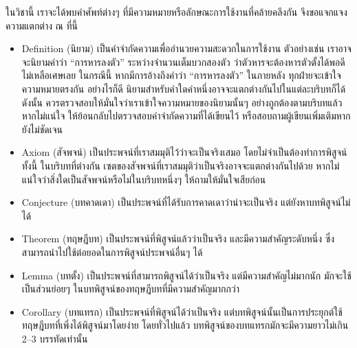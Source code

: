 ในวิชานี้ เราจะได้พบคำศัพท์ต่างๆ ที่มีความหมายหรือลักษณะการใช้งานที่คล้ายคลึงกัน จึงขอแจกแจงความแตกต่าง ณ ที่นี้
\begin{itemize}
    \item Definition (นิยาม) เป็นคำจำกัดความเพื่ออำนวยความสะดวกในการใช้งาน \enskip ตัวอย่างเช่น เราอาจจะนิยามคำว่า ``การหารลงตัว'' ระหว่างจำนวนเต็มบวกสองตัว ว่าตัวหารจะต้องหารตัวตั้งได้พอดี ไม่เหลือเศษเลย \enskip ในกรณีนี้ หากมีการอ้างถึงคำว่า ``การหารลงตัว'' ในภายหลัง ทุกฝ่ายจะเข้าใจความหมายตรงกัน \enskip อย่างไรก็ดี นิยามสำหรับคำใดคำหนึ่งอาจจะแตกต่างกันไปในแต่ละบริบทก็ได้ ดังนั้น ควรตรวจสอบให้มั่นใจว่าเราเข้าใจความหมายของนิยามนั้นๆ อย่างถูกต้องตามบริบทแล้ว \enskip หากไม่แน่ใจ ให้ย้อนกลับไปตรวจสอบคำจำกัดความที่ได้เขียนไว้ หรือสอบถามผู้เขียนเพิ่มเติมหากยังไม่ชัดเจน
    \item Axiom (สัจพจน์) เป็นประพจน์ที่เราสมมุติไว้ว่าจะเป็นจริงเสมอ โดยไม่จำเป็นต้องทำการพิสูจน์ \enskip ทั้งนี้ ในบริบทที่ต่างกัน เซตของสัจพจน์ที่เราสมมุติว่าเป็นจริงอาจจะแตกต่างกันไปด้วย \enskip หากไม่แน่ใจว่าสิ่งใดเป็นสัจพจน์หรือไม่ในบริบทหนึ่งๆ ให้ถามให้มั่นใจเสียก่อน
    \item Conjecture (บทคาดเดา) เป็นประพจน์ที่ได้รับการคาดเดาว่าน่าจะเป็นจริง แต่ยังหาบทพิสูจน์ไม่ได้
    \item Theorem (ทฤษฎีบท) เป็นประพจน์ที่พิสูจน์แล้วว่าเป็นจริง และมีความสำคัญระดับหนึ่ง ซึ่งสามารถนำไปใช้ต่อ\-ยอดในการพิสูจน์ประพจน์อื่นๆ ได้
    \item Lemma (บทตั้ง) เป็นประพจน์ที่สามารถพิสูจน์ได้ว่าเป็นจริง แต่มีความสำคัญไม่มากนัก มักจะใช้เป็นส่วนย่อยๆ ในบทพิสูจน์ของทฤษฎีบทที่มีความสำคัญมากกว่า
    \item Corollary (บทแทรก) เป็นประพจน์ที่พิสูจน์ได้ว่าเป็นจริง แต่บทพิสูจน์นั้นเป็นการประยุกต์ใช้ทฤษฎีบทที่เพิ่งได้พิสูจน์มาโดยง่าย \enskip โดยทั่วไปแล้ว บทพิสูจน์ของบทแทรกมักจะมีความยาวไม่เกิน 2--3 บรรทัดเท่านั้น
\end{itemize}